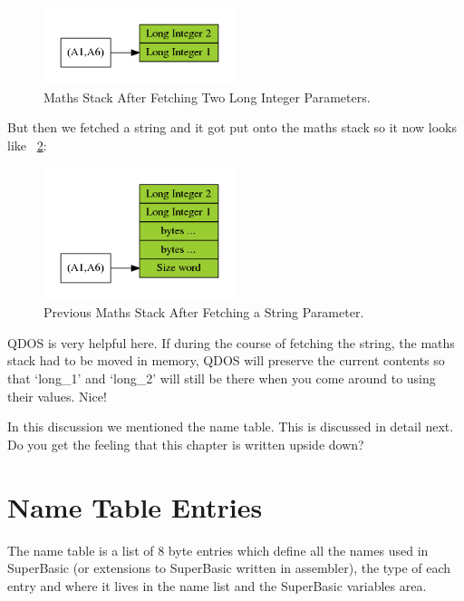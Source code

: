 \begin{figure}[h]
\center
\includegraphics[width=0.5\textwidth]{Content/images/Maths_Stack_2_Long.png}
\caption{Maths Stack After Fetching Two Long Integer Parameters.}
\label{fig:MathsStackAfterTwoLongInts}
\end{figure}

But then we fetched a string and it got put onto the maths stack
      so it now looks like \figurename~\ref{fig:MathsStackAfterTwoLongIntsPlusString}:

\begin{figure}[h]
\center
\includegraphics[width=0.5\textwidth]{Content/images/Maths_Stack_2_Long_and_String.png}
\caption{Previous Maths Stack After Fetching a String Parameter.}
\label{fig:MathsStackAfterTwoLongIntsPlusString}
\end{figure}

QDOS is very helpful here. If during the course of fetching the
      string, the maths stack had to be moved in memory, QDOS will preserve
      the current contents so that `long\_1' and `long\_2' will still be there
      when you come around to using their values. Nice!

In this discussion we mentioned the name table. This is discussed
      in detail next. Do you get the feeling that this chapter is written upside down?

\section{Name Table Entries}
\label{ch7-name-table}%

The name table is a list of 8 byte entries which define all the
    names used in SuperBasic (or extensions to SuperBasic written in
    assembler), the type of each entry and where it lives in the name list and
    the SuperBasic variables area.

